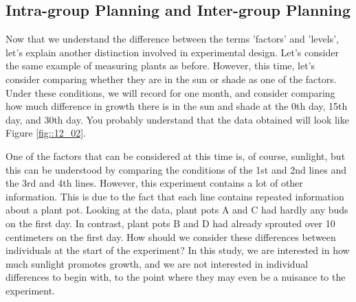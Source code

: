 \documentclass{ltjbook}
\begin{document}
\subsection{Intra-group Planning and Inter-group Planning}

Now that we understand the difference between the terms 'factors' and 'levels', let's explain another distinction involved in experimental design. Let's consider the same example of measuring plants as before. However, this time, let's consider comparing whether they are in the sun or shade as one of the factors. Under these conditions, we will record for one month, and consider comparing how much difference in growth there is in the sun and shade at the 0th day, 15th day, and 30th day. You probably understand that the data obtained will look like Figure \ref{fig::12_02}.



One of the factors that can be considered at this time is, of course, sunlight, but this can be understood by comparing the conditions of the 1st and 2nd lines and the 3rd and 4th lines. However, this experiment contains a lot of other information. This is due to the fact that each line contains repeated information about a plant pot. Looking at the data, plant pots A and C had hardly any buds on the first day. In contrast, plant pots B and D had already sprouted over 10 centimeters on the first day. How should we consider these differences between individuals at the start of the experiment? In this study, we are interested in how much sunlight promotes growth, and we are not interested in individual differences to begin with, to the point where they may even be a nuisance to the experiment.
\end{document}
